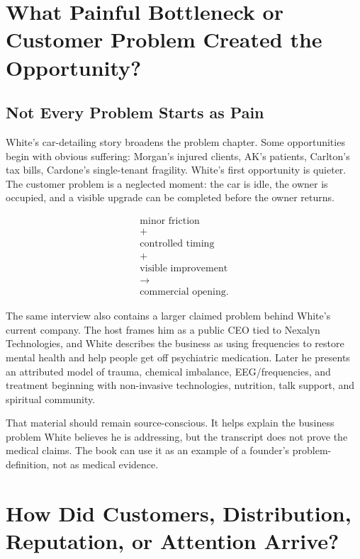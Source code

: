 \documentclass[11pt,oneside]{book}
\begin{document}
\chapter{What Painful Bottleneck or Customer Problem Created the Opportunity?}

\section{Not Every Problem Starts as Pain}

White's car-detailing story broadens the problem chapter. Some opportunities begin with obvious suffering: Morgan's injured clients, AK's patients, Carlton's tax bills, Cardone's single-tenant fragility. White's first opportunity is quieter. The customer problem is a neglected moment: the car is idle, the owner is occupied, and a visible upgrade can be completed before the owner returns.

\begin{equation}
\begin{gathered}
\text{minor friction}\\
+\\
\text{controlled timing}\\
+\\
\text{visible improvement}\\
\longrightarrow\\
\text{commercial opening}.
\end{gathered}
\end{equation}

The same interview also contains a larger claimed problem behind White's current company. The host frames him as a public CEO tied to Nexalyn Technologies, and White describes the business as using frequencies to restore mental health and help people get off psychiatric medication. Later he presents an attributed model of trauma, chemical imbalance, EEG/frequencies, and treatment beginning with non-invasive technologies, nutrition, talk support, and spiritual community.

That material should remain source-conscious. It helps explain the business problem White believes he is addressing, but the transcript does not prove the medical claims. The book can use it as an example of a founder's problem-definition, not as medical evidence.

\chapter{How Did Customers, Distribution, Reputation, or Attention Arrive?}
\end{document}
